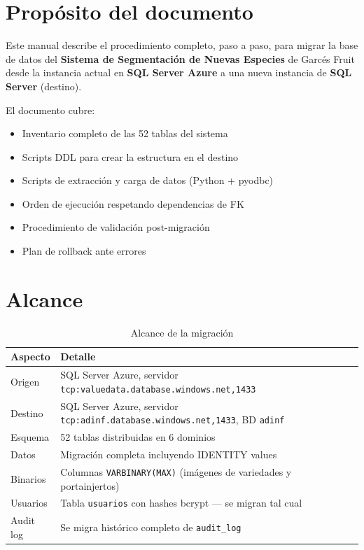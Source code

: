 \documentclass[12pt,a4paper,twoside]{report}
\begin{document}
\section{Prop\'osito del documento}

Este manual describe el procedimiento completo, paso a paso, para migrar la base de datos del \textbf{Sistema de Segmentaci\'on de Nuevas Especies} de Garc\'es Fruit desde la instancia actual en \textbf{SQL Server Azure} a una nueva instancia de \textbf{SQL Server} (destino).

El documento cubre:
\begin{itemize}[noitemsep]
    \item Inventario completo de las 52 tablas del sistema
    \item Scripts DDL para crear la estructura en el destino
    \item Scripts de extracci\'on y carga de datos (Python + pyodbc)
    \item Orden de ejecuci\'on respetando dependencias de FK
    \item Procedimiento de validaci\'on post-migraci\'on
    \item Plan de rollback ante errores
\end{itemize}

\section{Alcance}

\begin{table}[H]
\centering
\caption{Alcance de la migraci\'on}
\begin{tabularx}{\textwidth}{lX}
\toprule
\textbf{Aspecto} & \textbf{Detalle} \\
\midrule
Origen & SQL Server Azure, servidor \texttt{tcp:valuedata.database.windows.net,1433} \\
Destino & SQL Server Azure, servidor \texttt{tcp:adinf.database.windows.net,1433}, BD \texttt{adinf} \\
Esquema & 52 tablas distribuidas en 6 dominios \\
Datos & Migraci\'on completa incluyendo IDENTITY values \\
Binarios & Columnas \texttt{VARBINARY(MAX)} (im\'agenes de variedades y portainjertos) \\
Usuarios & Tabla \texttt{usuarios} con hashes bcrypt --- se migran tal cual \\
Audit log & Se migra hist\'orico completo de \texttt{audit\_log} \\
\bottomrule
\end{tabularx}
\end{table}
\end{document}
